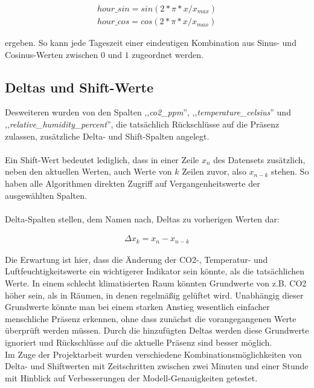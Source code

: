 \begin{align}
    hour\_sin = sin(2 * \pi * x / x_{max}) \\ 
    hour\_cos = cos(2 * \pi * x / x_{max})
\end{align} 

ergeben. So kann jede Tageszeit einer eindeutigen Kombination aus Sinus- und Cosinus-Werten zwischen 
$0$ und $1$ zugeordnet werden.

\subsection{Deltas und Shift-Werte}
Desweiteren wurden von den Spalten ,,\textit{co2\_ppm}'', ,,\textit{temperature\_celsius}'' und \break 
,,\textit{relative\_humidity\_percent}'', die tatsächlich Rückschlüsse auf die Präsenz zulassen, \break 
zusätzliche Delta- und Shift-Spalten angelegt.\\\\
Ein Shift-Wert bedeutet lediglich, dass  in einer Zeile $x_n$ des Datensets 
zusätzlich, neben den aktuellen Werten, auch Werte von $k$ Zeilen zuvor, also $x_{n-k}$ stehen. So haben 
alle Algorithmen direkten Zugriff auf Vergangenheitswerte der ausgewählten Spalten.\\\\
Delta-Spalten stellen, dem Namen nach, Deltas zu vorherigen Werten dar:

\begin{align}
    \Delta x_k = x_n - x_{n-k}    
\end{align}

Die Erwartung ist hier, dass die Änderung der CO2-, Temperatur- und 
Luftfeuchtigkeitswerte ein wichtigerer Indikator sein könnte, als die tatsächlichen Werte. In einem schlecht 
klimatisierten Raum könnten Grundwerte von z.B. CO2 höher sein, als in Räumen, in denen regelmäßig gelüftet wird.
Unabhängig dieser Grundwerte könnte man bei einem starken Anstieg wesentlich einfacher menschliche Präsenz erkennen, 
ohne dass zunächst die vorangegangenen Werte überprüft werden müssen.
Durch die hinzufügten 
Deltas werden diese Grundwerte ignoriert und Rückschlüsse auf die aktuelle Präsenz sind besser möglich.\\
Im Zuge der Projektarbeit wurden verschiedene Kombinationsmöglichkeiten von Delta- und Shiftwerten mit 
Zeitschritten zwischen zwei Minuten und einer Stunde mit Hinblick auf Verbesserungen der Modell-Genauigkeiten 
getestet.

